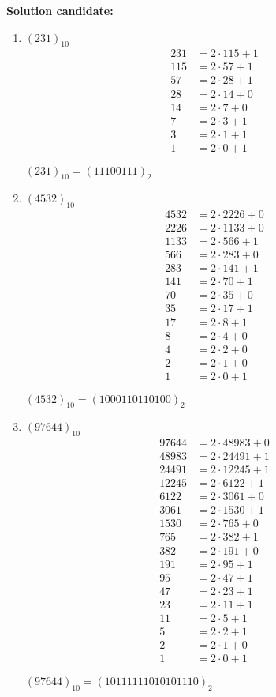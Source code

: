 \documentclass{report}
\newcommand{\cent}[1]{\begin{center}#1\end{center}}
\newcommand{\mAlign}[1]{\begin{align*}#1\end{align*}}
\newcommand{\Solution}{\textbf{Solution candidate: }}
\newcommand{\defaultEnumerateLabel}{\textbf{\alph*.}}
\newcommand{\MyItem}[1]{\item #1\\}
\newcommand{\decimal}[1]{(#1)_{10}}
\newcommand{\binary}[1]{(#1)_2}
\begin{document}
\begin{enumerate}[label=\defaultEnumerateLabel]
	\Solution
	
	\begin{enumerate}[label= \defaultEnumerateLabel]
		\MyItem{$\decimal{231}$}
		
		\mAlign{
			231 &= 2 \cdot 115+1 \\
			115 &= 2 \cdot 57 + 1 \\
			57 &= 2 \cdot 28 + 1 \\
			28 &= 2 \cdot 14 + 0 \\
			14 &= 2 \cdot 7 + 0 \\
			7 &= 2 \cdot 3 + 1 \\
			3 &= 2 \cdot 1 + 1 \\
			1 &= 2 \cdot 0 + 1}
		
		\cent{$ \decimal{231}=\binary{11100111}$}
		
		\MyItem{$\decimal{4532}$}
		
		\mAlign{
			4532 &= 2 \cdot 2226 + 0 \\
			2226 &= 2 \cdot 1133 + 0 \\
			1133 &= 2 \cdot 566 + 1 \\
			566 &= 2 \cdot 283 + 0\\
			283 &= 2 \cdot 141 + 1 \\
			141 &= 2 \cdot 70 + 1 \\
			70 &= 2 \cdot 35 + 0 \\
			35 &= 2 \cdot 17 + 1 \\
			17 &= 2 \cdot 8 + 1\\
			8 &= 2 \cdot 4 + 0 \\
			4 &= 2 \cdot 2 + 0 \\
			2 &= 2 \cdot 1 + 0 \\
			1 &= 2 \cdot 0 + 1
		}
		
		\cent{$\decimal{4532} = \binary{1000110110100}$}
		
		\MyItem{$\decimal{97644}$}
		\mAlign{
			97644 &= 2 \cdot 48983+ 0 \\
			48983 &= 2 \cdot 24491 + 1 \\
			24491 &= 2 \cdot 12245 + 1 \\
			12245 &= 2 \cdot 6122 + 1 \\
			6122 &= 2 \cdot 3061 + 0 \\
			3061 &= 2 \cdot 1530 + 1 \\
			1530 &= 2 \cdot 765 + 0\\
			765 &= 2 \cdot 382 + 1 \\
			382 &= 2 \cdot 191 + 0 \\
			191 &= 2 \cdot 95 + 1 \\
			95 &= 2 \cdot 47 + 1 \\
			47 &= 2 \cdot 23 + 1 \\
			23 &= 2 \cdot 11 + 1 \\
			11 &= 2 \cdot 5 + 1 \\
			5 &= 2 \cdot 2 + 1 \\
			2 &= 2 \cdot 1 + 0 \\
			1 &= 2 \cdot 0 + 1
		}
	\cent{$\decimal{97644} = \binary{10111111010101110}$}
	\end{enumerate}
	

\end{enumerate}
\end{document}
